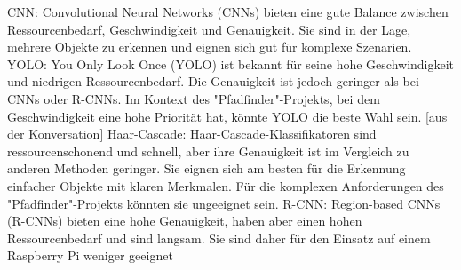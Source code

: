 \begin{table}[H]
    \caption{Nutzwertanlalyse Objekterkennung}
    \label{tab:konzept_nutzwertanalyse_aufnahme}
\end{table}

CNN: Convolutional Neural Networks (CNNs) bieten eine gute Balance zwischen Ressourcenbedarf, Geschwindigkeit und Genauigkeit. Sie sind in der Lage, mehrere Objekte zu erkennen und eignen sich gut für komplexe Szenarien.
YOLO: You Only Look Once (YOLO) ist bekannt für seine hohe Geschwindigkeit und niedrigen Ressourcenbedarf. Die Genauigkeit ist jedoch geringer als bei CNNs oder R-CNNs. Im Kontext des "Pfadfinder"-Projekts, bei dem Geschwindigkeit eine hohe Priorität hat, könnte YOLO die beste Wahl sein. [aus der Konversation]
Haar-Cascade: Haar-Cascade-Klassifikatoren sind ressourcenschonend und schnell, aber ihre Genauigkeit ist im Vergleich zu anderen Methoden geringer. Sie eignen sich am besten für die Erkennung einfacher Objekte mit klaren Merkmalen. Für die komplexen Anforderungen des "Pfadfinder"-Projekts könnten sie ungeeignet sein.
R-CNN: Region-based CNNs (R-CNNs) bieten eine hohe Genauigkeit, haben aber einen hohen Ressourcenbedarf und sind langsam. Sie sind daher für den Einsatz auf einem Raspberry Pi weniger geeignet

